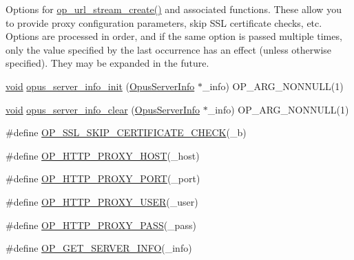 Options for \mbox{\hyperlink{group__stream__callbacks_ga5c588fac7542057282b50a5bd2dbb35a}{op\+\_\+url\+\_\+stream\+\_\+create()}} and associated functions. These allow you to provide proxy configuration parameters, skip S\+SL certificate checks, etc. Options are processed in order, and if the same option is passed multiple times, only the value specified by the last occurrence has an effect (unless otherwise specified). They may be expanded in the future. \begin{DoxyCompactItemize}
\item 
\mbox{\hyperlink{_s_d_l__opengles2__gl2ext_8h_ae5d8fa23ad07c48bb609509eae494c95}{void}} \mbox{\hyperlink{group__url__options_ga8a8c97266e46504e064bba1a70495738}{opus\+\_\+server\+\_\+info\+\_\+init}} (\mbox{\hyperlink{struct_opus_server_info}{Opus\+Server\+Info}} $\ast$\+\_\+info) O\+P\+\_\+\+A\+R\+G\+\_\+\+N\+O\+N\+N\+U\+LL(1)
\item 
\mbox{\hyperlink{_s_d_l__opengles2__gl2ext_8h_ae5d8fa23ad07c48bb609509eae494c95}{void}} \mbox{\hyperlink{group__url__options_ga096536e460277fe890acb265d8fdbd63}{opus\+\_\+server\+\_\+info\+\_\+clear}} (\mbox{\hyperlink{struct_opus_server_info}{Opus\+Server\+Info}} $\ast$\+\_\+info) O\+P\+\_\+\+A\+R\+G\+\_\+\+N\+O\+N\+N\+U\+LL(1)
\item 
\#define \mbox{\hyperlink{group__url__options_ga71080150b55e223be2710a0307108b72}{O\+P\+\_\+\+S\+S\+L\+\_\+\+S\+K\+I\+P\+\_\+\+C\+E\+R\+T\+I\+F\+I\+C\+A\+T\+E\+\_\+\+C\+H\+E\+CK}}(\+\_\+b)
\item 
\#define \mbox{\hyperlink{group__url__options_gab3b517acdb74c0d0b51800af86a58876}{O\+P\+\_\+\+H\+T\+T\+P\+\_\+\+P\+R\+O\+X\+Y\+\_\+\+H\+O\+ST}}(\+\_\+host)
\item 
\#define \mbox{\hyperlink{group__url__options_ga838d23878f4135691684203baa75ed0c}{O\+P\+\_\+\+H\+T\+T\+P\+\_\+\+P\+R\+O\+X\+Y\+\_\+\+P\+O\+RT}}(\+\_\+port)
\item 
\#define \mbox{\hyperlink{group__url__options_gaf0ce8d761ff48697fa0c44a62a445842}{O\+P\+\_\+\+H\+T\+T\+P\+\_\+\+P\+R\+O\+X\+Y\+\_\+\+U\+S\+ER}}(\+\_\+user)
\item 
\#define \mbox{\hyperlink{group__url__options_gaad96c33557407e406cca89477b2e7892}{O\+P\+\_\+\+H\+T\+T\+P\+\_\+\+P\+R\+O\+X\+Y\+\_\+\+P\+A\+SS}}(\+\_\+pass)
\item 
\#define \mbox{\hyperlink{group__url__options_gacc2e4b086bee832d5d66caf18fd7d659}{O\+P\+\_\+\+G\+E\+T\+\_\+\+S\+E\+R\+V\+E\+R\+\_\+\+I\+N\+FO}}(\+\_\+info)
\end{DoxyCompactItemize}


